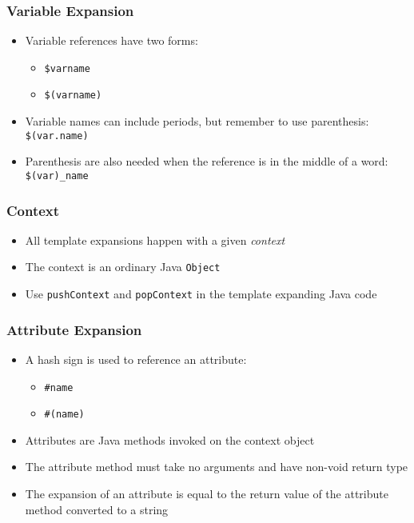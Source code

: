 \documentclass[a4paper,12pt,presentation]{beamer}
\begin{document}
\begin{frame}[fragile]
    \frametitle{Variable Expansion}

    \begin{itemize}
        \item Variable references have two forms:
            \begin{itemize}
                \item \verb'$varname'
                \item \verb'$(varname)'
            \end{itemize}
        \item Variable names can include periods, but remember to use
            parenthesis: \verb'$(var.name)'
        \item Parenthesis are also needed when the reference
            is in the middle of a word: \verb'$(var)_name'
    \end{itemize}
    
\end{frame}

\begin{frame}[fragile]
    \frametitle{Context}

    \begin{itemize}
        \item All template expansions happen with a given \emph{context}
        \item The context is an ordinary Java \verb'Object'
        \item Use \verb'pushContext' and \verb'popContext' in the template
            expanding Java code
    \end{itemize}
    
\end{frame}

\begin{frame}[fragile]
    \frametitle{Attribute Expansion}

    \begin{itemize}
        \item A hash sign is used to reference an attribute:
            \begin{itemize}
                \item \verb'#name'
                \item \verb'#(name)'
            \end{itemize}
        \item Attributes are Java methods invoked on the context object
        \item The attribute method must take no arguments and have non-void
            return type
        \item The expansion of an attribute is equal to the return value
            of the attribute method converted to a string
    \end{itemize}
    
\end{frame}
\end{document}

